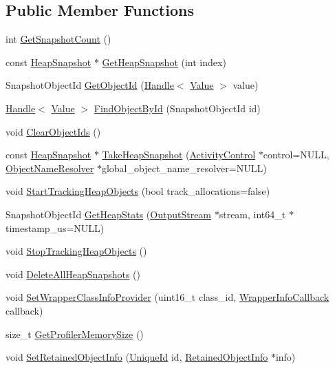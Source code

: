 \subsection*{Public Member Functions}
\begin{DoxyCompactItemize}
\item 
int \hyperlink{classv8_1_1_heap_profiler_a24830775a0ab938eb0a29ed8f3dfd265}{Get\+Snapshot\+Count} ()
\item 
const \hyperlink{classv8_1_1_heap_snapshot}{Heap\+Snapshot} $\ast$ \hyperlink{classv8_1_1_heap_profiler_af9093f6ca6e5558315f354c7ccb55484}{Get\+Heap\+Snapshot} (int index)
\item 
Snapshot\+Object\+Id \hyperlink{classv8_1_1_heap_profiler_a03157eb3b1d28e602832026f95c6e3fb}{Get\+Object\+Id} (\hyperlink{classv8_1_1_local}{Handle}$<$ \hyperlink{classv8_1_1_value}{Value} $>$ value)
\item 
\hyperlink{classv8_1_1_local}{Handle}$<$ \hyperlink{classv8_1_1_value}{Value} $>$ \hyperlink{classv8_1_1_heap_profiler_ab2fdc8f223c13436cc2136b99cb92a17}{Find\+Object\+By\+Id} (Snapshot\+Object\+Id id)
\item 
void \hyperlink{classv8_1_1_heap_profiler_a8a90c630543ed1875cbf9166239ff8d3}{Clear\+Object\+Ids} ()
\item 
const \hyperlink{classv8_1_1_heap_snapshot}{Heap\+Snapshot} $\ast$ \hyperlink{classv8_1_1_heap_profiler_a4af9159585ab024175d8eff551804ea8}{Take\+Heap\+Snapshot} (\hyperlink{classv8_1_1_activity_control}{Activity\+Control} $\ast$control=N\+U\+L\+L, \hyperlink{classv8_1_1_heap_profiler_1_1_object_name_resolver}{Object\+Name\+Resolver} $\ast$global\+\_\+object\+\_\+name\+\_\+resolver=N\+U\+L\+L)
\item 
void \hyperlink{classv8_1_1_heap_profiler_a02917db133b7efd468c9c73075a15171}{Start\+Tracking\+Heap\+Objects} (bool track\+\_\+allocations=false)
\item 
Snapshot\+Object\+Id \hyperlink{classv8_1_1_heap_profiler_a756d71126e0effc7543fb33e856dd738}{Get\+Heap\+Stats} (\hyperlink{classv8_1_1_output_stream}{Output\+Stream} $\ast$stream, int64\+\_\+t $\ast$timestamp\+\_\+us=N\+U\+L\+L)
\item 
void \hyperlink{classv8_1_1_heap_profiler_ae448d9474ae34781133d4a4547b08cb1}{Stop\+Tracking\+Heap\+Objects} ()
\item 
void \hyperlink{classv8_1_1_heap_profiler_a6a75bcc6d8350858597b6a6ce5e349a2}{Delete\+All\+Heap\+Snapshots} ()
\item 
void \hyperlink{classv8_1_1_heap_profiler_a7744cf111ad9c6b0b409841f8ed8bcdd}{Set\+Wrapper\+Class\+Info\+Provider} (uint16\+\_\+t class\+\_\+id, \hyperlink{classv8_1_1_heap_profiler_a696d8d6590879eeb5a4ad2814eafb599}{Wrapper\+Info\+Callback} callback)
\item 
size\+\_\+t \hyperlink{classv8_1_1_heap_profiler_a76435e93466db7519fb31417ea39b13e}{Get\+Profiler\+Memory\+Size} ()
\item 
void \hyperlink{classv8_1_1_heap_profiler_a70821ff8e1c2cc92c310c5c4f1fa5ec7}{Set\+Retained\+Object\+Info} (\hyperlink{classv8_1_1_unique_id}{Unique\+Id} id, \hyperlink{classv8_1_1_retained_object_info}{Retained\+Object\+Info} $\ast$info)
\end{DoxyCompactItemize}
